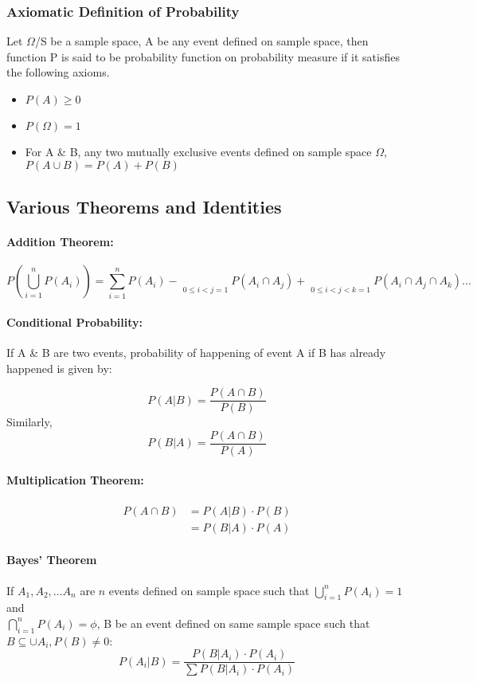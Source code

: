 \documentclass[
10pt, %
a4paper, %
]{report}
\begin{document}
\subsubsection*{Axiomatic Definition of Probability}
    Let \(\Omega\)/S be a sample space, A be any event defined on sample space, then function P is said to be probability function on probability measure if it satisfies the following axioms.
    \begin{itemize}
    \item \(P(A)\geq 0\)
    \item \(P(\Omega)=1\)
    \item For A \& B, any two mutually exclusive events defined on sample space \(\Omega\), \(P(A\cup B) = P(A)+P(B)\)
    \end{itemize}
    

\subsection*{Various Theorems and Identities}
\paragraph{Addition Theorem:}
\[
P\left(\bigcup_{i=1}^n P(A_i)\right)=\sum_{i=1}^n P(A_i) - \mathop{\sum^n \sum^n}\limits_{0 \leq i < j=1} P(A_i \cap A_j) + \mathop{\sum^n \sum^n \sum^n}\limits_{0 \leq i < j < k=1} P(A_i \cap A_j \cap A_k) \dots \]


\paragraph{Conditional Probability:}

If A \& B are two events, probability of happening of event A if B has already happened is given by:

\[
P(A|B) = \frac{P(A\cap B)}{P(B)}
\]
Similarly, 
\[
P(B|A) = \frac{P(A\cap B)}{P(A)}
\]

\paragraph{Multiplication Theorem:}

\begin{align*}
    P(A\cap B) &= P(A|B) \cdot P(B) \\
               &= P(B|A) \cdot P(A)
\end{align*}

\paragraph{Bayes' Theorem}
If \(A_1, A_2, \dots A_n\) are \(n\) events defined on sample space such that \(\bigcup_{i=1}^n P(A_i)=1\) and \\ \(\bigcap_{i=1}^n P(A_i)=\phi\), B be an event defined on same sample space such that \(B\subseteq \cup A_i, P(B)\neq 0\):
\[
P(A_i| B) = \frac{P(B|A_i)\cdot P(A_i)}{\sum P(B|A_i)\cdot P(A_i)}
\]
\end{document}
